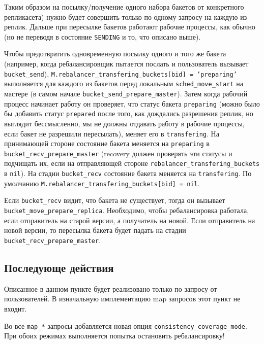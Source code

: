 Таким образом на посылку/получение одного набора бакетов от конкретного
репликасета) нужно будет совершить только по одному запросу на каждую из
реплик. Дальше при пересылке бакетов работают рабочие процессы, как обычно (но
не переводя в состояние \texttt{SENDING} и то, что описано выше).

Чтобы предотвратить одновременную посылку одного и того же бакета (например,
когда ребалансировщик пытается послать и пользователь вызывает
\texttt{bucket\_send}), \texttt{M.rebalancer\_transfering\_buckets[bid] =
'preparing'} выполняется для каждого из бакетов перед локальным
\texttt{sched\_move\_start} на мастере (в самом начале
\texttt{bucket\_send\_prepare\_master}). Затем когда рабочий процесс начинает
работу он проверяет, что статус бакета \texttt{preparing} (можно было бы
добавить статус \texttt{prepared} после того, как дождались разрешения реплик,
но выглядит бессмысленно, мы не должны отдавать работу в рабочие процессы, если
бакет не разрешили пересылать), меняет его в \texttt{transfering}. На
принимающей стороне состояние бакета меняется на \texttt{preparing} в
\texttt{bucket\_recv\_prepare\_master} (recovery должен проверять эти статусы и
подчищать их, если на отправляющей стороне
\texttt{rebalancer\_transfering\_buckets} в \texttt{nil}). На стадии
\texttt{bucket\_recv} состояние бакета меняется на \texttt{transfering}. По
умолчанию \texttt{M.rebalancer\_transfering\_buckets[bid] = nil}.

Если \texttt{bucket\_recv} видит, что бакета не существует, тогда он вызывает
\texttt{bucket\_move\_prepare\_replica}. Необходимо, чтобы ребалансировка
работала, если отправитель на старой версии, а получатель на новой. Если
отправитель на новой версии, то пересылка бакета будет падать на стадии
\texttt{bucket\_recv\_prepare\_master}.

\subsection{Последующе действия}

Описанное в данном пункте будет реализовано только по запросу от пользователей.
В изначальную имплементацию map запросов этот пункт не входит.

Во все \texttt{map\_*} запросы добавляется новая опция
\texttt{consistency\_coverage\_mode}. При обоих режимах выполняется попытка
остановить ребалансировку!


